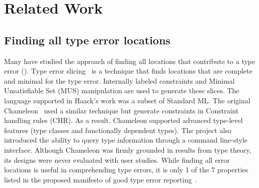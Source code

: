 \section{Related Work}



\subsection{Finding all type error locations}
Many have studied the approach of finding all locations that contribute to a type error (\cite{stuckey_interactive_2003, haack_type_2004, pavlinovic_practical_2015, schilling_constraint-free_2012}). Type error slicing~\cite{haack_type_2004} is a technique that finds locations that are complete and minimal for the type error. Internally labeled constraints and Minimal Unsatisfiable Set (MUS) manipulation are used to generate these slices. The language supported in Haack's work was a subset of Standard ML. The original Chameleon~\cite{stuckey_interactive_2003} used a similar technique but generate constraints in Constraint handling rules (CHR). As a result,  Chameleon supported advanced type-level features (type classes and functionally dependent types). The project also introduced the ability to query type information through a command line-style interface. Although Chameleon was firmly grounded in results from type theory, its designs were never evaluated with user studies. While finding all error locations is useful in comprehending type errors, it is only 1 of the 7 properties listed in the proposed manifesto of good type error reporting~\cite{yang_improved_2000}. 


